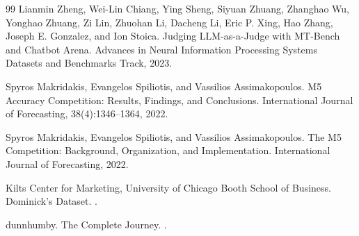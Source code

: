 \documentclass[11pt]{article}
\begin{document}
\begin{thebibliography}{99}
Lianmin Zheng, Wei-Lin Chiang, Ying Sheng, Siyuan Zhuang, Zhanghao Wu, Yonghao Zhuang, Zi Lin, Zhuohan Li, Dacheng Li, Eric P. Xing, Hao Zhang, Joseph E. Gonzalez, and Ion Stoica.
\newblock Judging LLM-as-a-Judge with MT-Bench and Chatbot Arena.
\newblock Advances in Neural Information Processing Systems Datasets and Benchmarks Track, 2023.

Spyros Makridakis, Evangelos Spiliotis, and Vassilios Assimakopoulos.
\newblock M5 Accuracy Competition: Results, Findings, and Conclusions.
\newblock International Journal of Forecasting, 38(4):1346--1364, 2022.

Spyros Makridakis, Evangelos Spiliotis, and Vassilios Assimakopoulos.
\newblock The M5 Competition: Background, Organization, and Implementation.
\newblock International Journal of Forecasting, 2022.

Kilts Center for Marketing, University of Chicago Booth School of Business.
\newblock Dominick's Dataset.
.

dunnhumby.
\newblock The Complete Journey.
.

\end{thebibliography}
\end{document}
